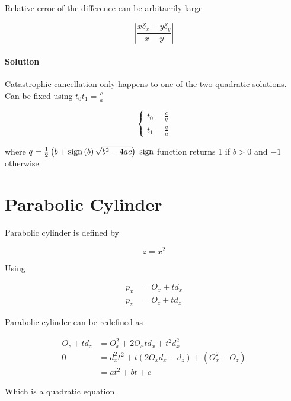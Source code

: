     Relative error of the difference can be arbitarrily large

    \begin{equation}
      \left| \frac{x \delta_{x} - y \delta_{y}}{x - y} \right|
    \end{equation}

    \paragraph{Solution} Catastrophic cancellation only happens to one of the
    two quadratic solutions. Can be fixed using $ t_{0} t_{1} = \frac{c}{a} $

    \begin{equation}
      \begin{cases}
        t_{0} = \frac{c}{q} \\
        t_{1} = \frac{q}{a}
      \end{cases}
    \end{equation}

    where $ q = \frac{1}{2}\left( b + \operatorname{sign}\left( b \right) \sqrt{b^{2} - 4ac} \right) $
    $ \operatorname{sign} $ function returns 1 if $ b > 0 $ and $ - 1 $ otherwise

\section{Parabolic Cylinder}

  Parabolic cylinder is defined by

  \begin{equation}
    z = x^{2}
  \end{equation}

  Using

  \begin{align*}
    p_{x} &= O_{x} + t d_{x} \\
    p_{z} &= O_{z} + t d_{z}
  \end{align*}

  Parabolic cylinder can be redefined as

  \begin{align*}
    O_{z} + t d_{z} &= O_{x}^{2} + 2 O_{x} t d_{x} + t^{2} d_{x}^{2} \\
    0 &= d_{x}^{2} t^{2} + t \left( 2 O_{x} d_{x} - d_{z} \right)
      + \left( O_{x}^{2} - O_{z} \right) \\
      &= a t^{2} + bt + c
  \end{align*}

  Which is a quadratic equation
